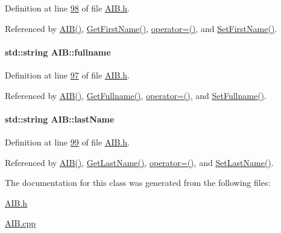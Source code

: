 Definition at line \hyperlink{_a_i_b_8h_source_l00098}{98} of file \hyperlink{_a_i_b_8h_source}{A\+I\+B.\+h}.



Referenced by \hyperlink{_a_i_b_8h_source_l00023}{A\+I\+B()}, \hyperlink{_a_i_b_8cpp_source_l00097}{Get\+First\+Name()}, \hyperlink{_a_i_b_8h_source_l00066}{operator=()}, and \hyperlink{_a_i_b_8cpp_source_l00093}{Set\+First\+Name()}.

\paragraph[{\texorpdfstring{fullname}{fullname}}]{\setlength{\rightskip}{0pt plus 5cm}std\+::string A\+I\+B\+::fullname\hspace{0.3cm}{\ttfamily [private]}}\hypertarget{class_a_i_b_a818b0cc283af23127c067fb3fc751058_a818b0cc283af23127c067fb3fc751058}{}\label{class_a_i_b_a818b0cc283af23127c067fb3fc751058_a818b0cc283af23127c067fb3fc751058}


Definition at line \hyperlink{_a_i_b_8h_source_l00097}{97} of file \hyperlink{_a_i_b_8h_source}{A\+I\+B.\+h}.



Referenced by \hyperlink{_a_i_b_8h_source_l00023}{A\+I\+B()}, \hyperlink{_a_i_b_8cpp_source_l00105}{Get\+Fullname()}, \hyperlink{_a_i_b_8h_source_l00066}{operator=()}, and \hyperlink{_a_i_b_8cpp_source_l00101}{Set\+Fullname()}.

\paragraph[{\texorpdfstring{last\+Name}{lastName}}]{\setlength{\rightskip}{0pt plus 5cm}std\+::string A\+I\+B\+::last\+Name\hspace{0.3cm}{\ttfamily [private]}}\hypertarget{class_a_i_b_ace7b8b648d1b44b7ee2f4be002952b7a_ace7b8b648d1b44b7ee2f4be002952b7a}{}\label{class_a_i_b_ace7b8b648d1b44b7ee2f4be002952b7a_ace7b8b648d1b44b7ee2f4be002952b7a}


Definition at line \hyperlink{_a_i_b_8h_source_l00099}{99} of file \hyperlink{_a_i_b_8h_source}{A\+I\+B.\+h}.



Referenced by \hyperlink{_a_i_b_8h_source_l00023}{A\+I\+B()}, \hyperlink{_a_i_b_8cpp_source_l00089}{Get\+Last\+Name()}, \hyperlink{_a_i_b_8h_source_l00066}{operator=()}, and \hyperlink{_a_i_b_8cpp_source_l00085}{Set\+Last\+Name()}.



The documentation for this class was generated from the following files\+:\begin{DoxyCompactItemize}
\item 
\hyperlink{_a_i_b_8h}{A\+I\+B.\+h}\item 
\hyperlink{_a_i_b_8cpp}{A\+I\+B.\+cpp}\end{DoxyCompactItemize}
